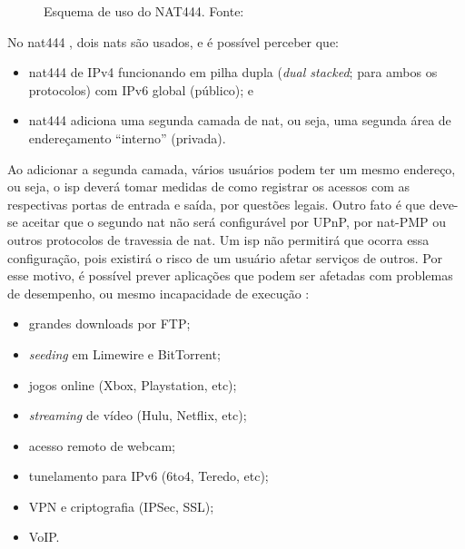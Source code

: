 \begin{figure}[H]
    \centering
    \caption{Esquema de uso do NAT444. Fonte:\cite{site:nat444}}
    \label{fig:nat444}
\end{figure}

\newpage
No \gls*{nat}444 \cite{site:nat444}, dois \glspl*{nat} são usados, e é possível
perceber que:

\begin{itemize}
    \item \gls*{nat}444 de IPv4 funcionando em pilha dupla (\emph{dual stacked}; para
        ambos os protocolos) com IPv6 global (público); e

    \item \gls*{nat}444 adiciona uma segunda camada de \gls*{nat}, ou seja, uma segunda
        área de endereçamento ``interno'' (privada).
\end{itemize}

Ao adicionar a segunda camada, vários usuários podem ter um mesmo endereço, ou seja, o
\gls*{isp} deverá tomar medidas de como registrar os acessos com as respectivas portas
de entrada e saída, por questões legais. Outro fato é que deve-se aceitar que o segundo
\gls*{nat} não será configurável por UPnP, por \gls*{nat}-PMP ou outros protocolos de
travessia de \gls*{nat}. Um \gls*{isp} não permitirá que ocorra essa configuração, pois
existirá o risco de um usuário afetar serviços de outros. Por esse motivo, é possível
prever aplicações que podem ser afetadas com problemas de desempenho, ou mesmo
incapacidade de execução \cite{site:rfcnat444}:

\begin{itemize}
    \item grandes downloads por FTP;
    \item \emph{seeding} em Limewire e BitTorrent;
    \item jogos online (Xbox, Playstation, etc);
    \item \emph{streaming} de vídeo (Hulu, Netflix, etc);
    \item acesso remoto de webcam;
    \item tunelamento para IPv6 (6to4, Teredo, etc);
    \item VPN e criptografia (IPSec, SSL);
    \item VoIP.
\end{itemize}